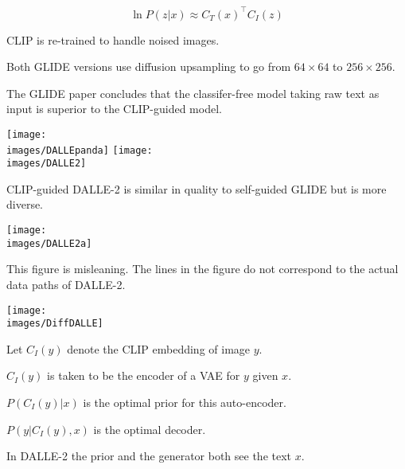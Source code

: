 {\vfill
$$\ln P(z|x) \approx C_T(x)^\top C_I(z)$$

\vfill
CLIP is re-trained to handle noised images.


Both GLIDE versions use diffusion upsampling to go from $64 \times 64$ to $256 \times 256$.

\vfill
The GLIDE paper concludes that the classifer-free model taking raw text as input is superior to the CLIP-guided model.


\centerline{\hfill \texttt{[image: \\images/DALLEpanda]} \hfill \texttt{[image: \\images/DALLE2]}}

CLIP-guided DALLE-2 is similar in quality to self-guided GLIDE but is more diverse.


\vfill
\centerline{\texttt{[image: \\images/DALLE2a]}}

This figure is misleaning.  The lines in the figure do not correspond to the actual data paths of DALLE-2.


\centerline{\texttt{[image: \\images/DiffDALLE]}}

\vfill
Let $C_I(y)$ denote the CLIP embedding of image $y$.

\vfill
$C_I(y)$ is taken to be the encoder of a VAE for $y$ given $x$.

\vfill
$P(C_I(y)|x)$ is the optimal prior for this auto-encoder.

\vfill
$P(y|C_I(y),x)$ is the optimal decoder.

\vfill
In DALLE-2 the prior and the generator both see the text $x$.

}



